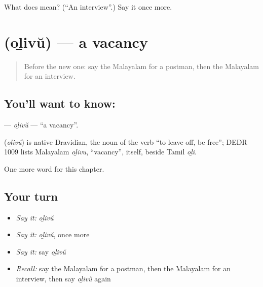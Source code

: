 \begin{tcolorbox}[breakable,colback=teal!4,colframe=teal!35!black,title={Before you move on}]
What does  mean? (\textquotedblleft{}An interview\textquotedblright{}.) Say it once more.
\end{tcolorbox}
\section[\texorpdfstring{\ml{ഒഴിവ്} (oḻivŭ)}{ഒഴിവ് (oḻivŭ)}]{ (oḻivŭ) — a vacancy}

\label{lesson:ML-C261-olivu}



\begin{quote}
Before the new one: say the Malayalam for a postman, then the Malayalam for an interview.
\end{quote}

\subsection*{You'll want to know: }
\textbf{} — \emph{oḻivŭ} — \textquotedblleft{}a vacancy\textquotedblright{}.

\begin{cousinweb}
\textbf{} (\emph{oḻivŭ}) is native Dravidian, the noun of the verb \textquotedblleft{}to leave off, be free\textquotedblright{}; DEDR 1009 lists Malayalam \emph{oḻivu}, \textquotedblleft{}vacancy\textquotedblright{}, itself, beside Tamil \emph{oḻi}.
\end{cousinweb}

\begin{grammarlens}[title={What you've built}]
One more word for this chapter.
\end{grammarlens}

\subsection*{Your turn}
\begin{itemize}
\raggedright
  \item \emph{Say it:} \emph{oḻivŭ}
  \item \emph{Say it:} \emph{oḻivŭ}, once more
  \item \emph{Say it:} say \emph{oḻivŭ}
  \item \emph{Recall:} say the Malayalam for a postman, then the Malayalam for an interview, then say \emph{oḻivŭ} again
\end{itemize}

